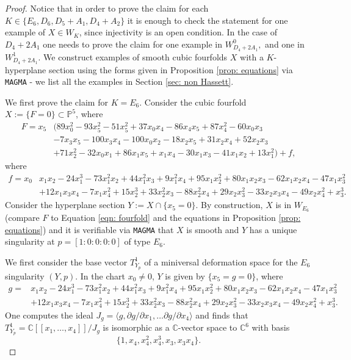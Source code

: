 \documentclass[12pt]{amsart}
\numberwithin{equation}{section}
\theoremstyle{plain}
\theoremstyle{remark}
\theoremstyle{definition}
\newcommand{\bP}{\mathbb{P}}
\newcommand{\bC}{\mathbb{C}}
\begin{document}
\begin{proof}
    Notice that in order to prove the claim for each $K\in \{E_6, D_6,D_5+A_1, D_4+A_2\}$ it is enough to check the statement for one example of $X\in W_K$, since injectivity is an open condition. In the case of $D_4+2A_1$ one needs to prove the claim for one example in $W_{D_4+2A_1}^0,$ and one in $ W_{D_4+2A_1}^1$.
    We construct examples of smooth cubic fourfolds $X$ with a $K$-hyperplane section using the forms given in Proposition \ref{prop: equations} via \verb|MAGMA| - we list all the examples  in Section \ref{sec: non Hassett}. 
    
    We first prove the claim for $K=E_6$.    
    Consider the cubic fourfold $X:=\{F=0\}\subset \bP^5$, where
    \begin{align*}
        F =x_5&(89x_0^2-93x_5^2-51x_5^2+37x_0x_4-86x_4x_5+87x_4^2-60x_0x_3\\
       & -7x_3x_5-100x_3x_4-100x_0x_2-18x_2x_5+31x_2x_4+52x_2x_3\\
       &+71x_2^2-32x_0x_1+86x_1x_5+x_1x_4-30x_1x_3-41x_1x_2+13x_1^2)+f,
    \end{align*}
    where 
    \begin{align*}
     f = x_0&x_1x_2 - 24x_1^3 - 73x_1^2x_2 + 44x_1^2x_3 + 9x_1^2x_4 + 95x_1x_2^2 + 
    80x_1x_2x_3 - 62x_1x_2x_4 - 47x_1x_3^2 \\
    &+ 12x_1x_3x_4 - 7x_1x_4^2 + 15x_2^3 +
    33x_2^2x_3 - 88x_2^2x_4 + 29x_2x_3^2 - 33x_2x_3x_4 - 49x_2x_4^2 + x_3^3.
    \end{align*}
    Consider the hyperplane section $Y:=X\cap \{x_5=0\}$.
    By construction, $X$ is in $W_{E_6}$ (compare $F$ to Equation \ref{eqn: fourfold} and the equations in Proposition \ref{prop: equations}) and it is verifiable via \verb|MAGMA| that $X$ is smooth and $Y$ has a unique singularity at $p=[1:0:0:0:0]$ of type $E_6$.
       
    We first consider the base vector $T^1_{Y_p}$ of a miniversal deformation space for the $E_6$ singularity $(Y,p).$
    In the  chart $x_0\neq 0$, $Y$ is given by $\{x_5=g=0\}$, where
    \begin{align*}
        g=&x_1x_2-24x_1^3 - 73x_1^2x_2 + 44x_1^2x_3 + 9x_1^2x_4 + 95x_1x_2^2 + 80x_1x_2x_3 - 
    62x_1x_2x_4 - 47x_1x_3^2 \\
    &+ 12x_1x_3x_4 - 7x_1x_4^2 + 15x_2^3 + 
    33x_2^2x_3 - 88x_2^2x_4 + 29x_2x_3^2 - 33x_2x_3x_4 - 49x_2x_4^2 + x_3^3.
    \end{align*}
    One computes the ideal $J_g=\langle g,\partial g/\partial x_1,\dots \partial g/\partial x_4\rangle$ and finds that $T^1_{Y_p}= \bC[[x_1,\ldots,x_4]]/J_g$ is isomorphic as a $\bC$-vector space to $\bC^6$ with basis
    \[
        \{1,x_4,x_4^2, x_4^3, x_3, x_3x_4\}.
    \]


\end{proof}
\end{document}
